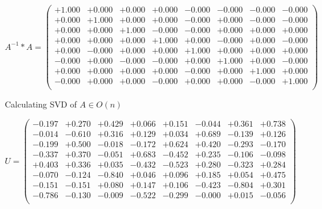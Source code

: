 \documentclass[9pt]{article}
\theoremstyle{plain}
\theoremstyle{definition}
\theoremstyle{remark}
\numberwithin{equation}{section}
\begin{document}
$A^{-1} *A = \left(
\begin{array}{
cccccccc}
+1.000 & +0.000 & +0.000 & +0.000 & -0.000 & -0.000 & -0.000 & -0.000 \\
+0.000 & +1.000 & +0.000 & +0.000 & -0.000 & +0.000 & -0.000 & -0.000 \\
+0.000 & +0.000 & +1.000 & -0.000 & -0.000 & +0.000 & +0.000 & +0.000 \\
+0.000 & +0.000 & +0.000 & +1.000 & +0.000 & -0.000 & +0.000 & -0.000 \\
+0.000 & -0.000 & +0.000 & +0.000 & +1.000 & +0.000 & +0.000 & +0.000 \\
-0.000 & +0.000 & -0.000 & -0.000 & +0.000 & +1.000 & +0.000 & -0.000 \\
+0.000 & +0.000 & +0.000 & +0.000 & -0.000 & +0.000 & +1.000 & +0.000 \\
-0.000 & +0.000 & +0.000 & -0.000 & +0.000 & +0.000 & -0.000 & +1.000 \\
\end{array}
\right)$ \newline 

Calculating SVD of  $A \in O(n)$

$U = \left(
\begin{array}{
cccccccc}
-0.197 & +0.270 & +0.429 & +0.066 & +0.151 & -0.044 & +0.361 & +0.738 \\
-0.014 & -0.610 & +0.316 & +0.129 & +0.034 & +0.689 & -0.139 & +0.126 \\
-0.199 & +0.500 & -0.018 & -0.172 & +0.624 & +0.420 & -0.293 & -0.170 \\
-0.337 & +0.370 & -0.051 & +0.683 & -0.452 & +0.235 & -0.106 & -0.098 \\
+0.403 & +0.336 & +0.035 & -0.432 & -0.523 & +0.280 & -0.323 & +0.284 \\
-0.070 & -0.124 & -0.840 & +0.046 & +0.096 & +0.185 & +0.054 & +0.475 \\
-0.151 & -0.151 & +0.080 & +0.147 & +0.106 & -0.423 & -0.804 & +0.301 \\
-0.786 & -0.130 & -0.009 & -0.522 & -0.299 & -0.000 & +0.015 & -0.056 \\
\end{array}
\right)$ \newline 
\end{document}
